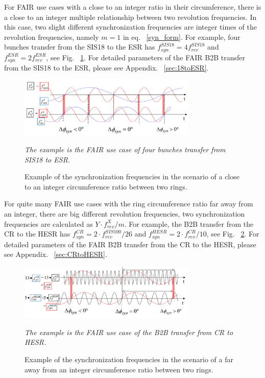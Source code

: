 For FAIR use cases with a close to an integer ratio in their circumference, there is a close to an integer multiple relationship between two revolution frequencies. In this case, two slight different synchronization frequencies are integer times of the revolution frequencies, namely $m=1$ in eq. ~\ref{syn_form}. For example, four bunches transfer from the SIS18 to the ESR has $f_{\mathit{syn}}^{SIS18}=4f_{\mathit{rev}}^{SIS18}$ and $f_{\mathit{syn}}^{ESR}=2f_{\mathit{rev}}^{ESR}$, see Fig. ~\ref{ESR}. For detailed parameters of the FAIR B2B transfer from the SIS18 to the ESR, please see Appendix. ~\ref{sec:18toESR}.
\begin{figure}[!htb]
   \centering   
   \includegraphics*[width=85mm]{cir_noint.jpg}
   \caption{Example of the synchronization frequencies in the scenario of a close to an integer circumference ratio between two rings.}
{\textsl{\small{The example is the FAIR use case of four bunches transfer from SIS18 to ESR.}}}
   \label{ESR}
\end{figure} 

For quite many FAIR use cases with the ring circumference ratio far away from an integer, there are big different revolution frequencies, two synchronization frequencies are calculated as $Y\cdot f_\mathit{rev}^{X}/m$. For example, the B2B transfer from the CR to the HESR has $f_{\mathit{syn}}^{CR}=2\cdot f_{\mathit{rev}}^{SIS100}/26$ and $f_{\mathit{syn}}^{HESR}=2\cdot f_{\mathit{rev}}^{CR}/10$, see Fig. ~\ref{CR-HESR}. For detailed parameters of the FAIR B2B transfer from the CR to the HESR, please see Appendix. ~\ref{sec:CRtoHESR}. 
\begin{figure}[!htb]
   \centering   
   \includegraphics*[width=85mm]{CR-HESR.png}
   \caption{Example of the synchronization frequencies in the scenario of a far away from an integer circumference ratio between two rings.}
{\textsl{\small{The example is the FAIR use case of the B2B transfer from CR to HESR.}}}
   \label{CR-HESR}
\end{figure} 

